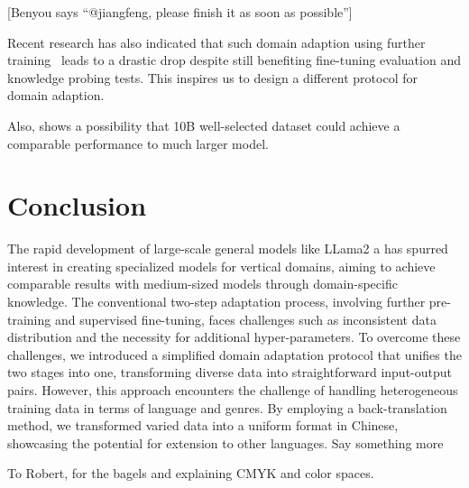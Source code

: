 \documentclass{article} %
\newcommand{\benyou}[1]{{ \color{blue} [Benyou says ``#1'']}}
\begin{document}
\benyou{@jiangfeng, please finish it as soon as possible}



Recent research has also indicated that such domain adaption using further training~\cite{cheng2023adapting} leads to a drastic drop despite still benefiting fine-tuning evaluation and knowledge probing tests. This inspires us to design a different protocol for domain adaption. 

Also, \cite{gunasekar2023textbooks,li2023textbooks} shows a possibility that 10B well-selected dataset could achieve a comparable performance to much larger model. 



\section{Conclusion}

The rapid development of large-scale general models like LLama2 a has spurred interest in creating specialized models for vertical domains, aiming to achieve comparable results with medium-sized models through domain-specific knowledge. The conventional two-step adaptation process, involving further pre-training and supervised fine-tuning, faces challenges such as inconsistent data distribution and the necessity for additional hyper-parameters. To overcome these challenges, we introduced a simplified domain adaptation protocol that unifies the two stages into one, transforming diverse data into straightforward input-output pairs. However, this approach encounters the challenge of handling heterogeneous training data in terms of language and genres. By employing a back-translation method, we  transformed varied data into a uniform format in Chinese, showcasing the potential for extension to other languages.  Say something more

\newpage
\begin{acks}
To Robert, for the bagels and explaining CMYK and color spaces.
\end{acks}




\appendix
\end{document}

